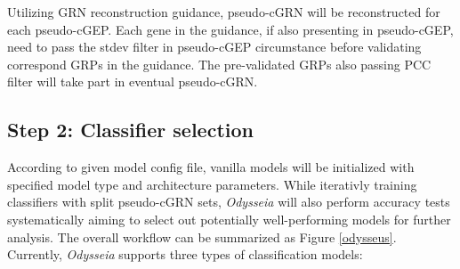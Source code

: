 \documentclass[fleqn,10pt]{wlscirep}
\begin{document}
Utilizing GRN reconstruction guidance, pseudo-cGRN will be reconstructed for each pseudo-cGEP.
Each gene in the guidance, if also presenting in pseudo-cGEP, need to pass the stdev filter in pseudo-cGEP circumstance before validating correspond GRPs in the guidance.
The pre-validated GRPs also passing PCC filter will take part in eventual pseudo-cGRN.

\subsection*{Step 2: Classifier selection}
\label{step2}
According to given model config file, vanilla models will be initialized with specified model type and architecture parameters.
While iterativly training classifiers with split pseudo-cGRN sets, \emph{Odysseia} will also perform accuracy tests systematically aiming to select out potentially well-performing models for further analysis.
The overall workflow can be summarized as Figure \ref{odysseus}.
Currently, \emph{Odysseia} supports three types of classification models:
\end{document}
